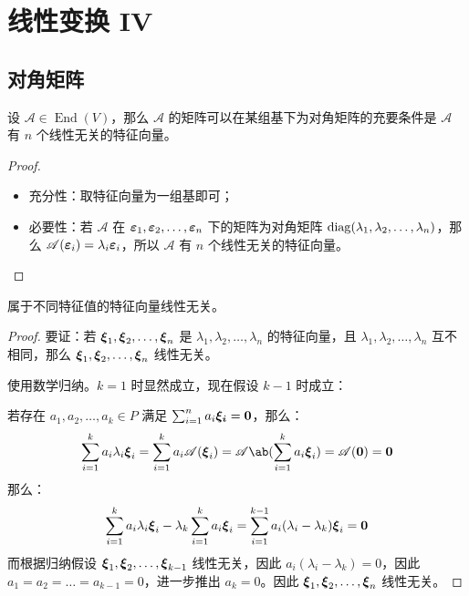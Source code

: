 \section{线性变换 IV}

\subsection{对角矩阵}

\begin{theorem}
	设 $\mathscr{A} \in \operatorname{End}(V)$，那么 $\mathscr{A}$ 的矩阵可以在某组基下为对角矩阵的充要条件是 $\mathscr{A}$ 有 $n$ 个线性无关的特征向量。

	\begin{proof}
		\begin{itemize}
			\item 充分性：取特征向量为一组基即可；
			\item 必要性：若 $\mathscr{A}$ 在 $\boldsymbol{\varepsilon}_1, \boldsymbol{\varepsilon}_2, \dots, \boldsymbol{\varepsilon}_n$ 下的矩阵为对角矩阵 $\operatorname{diag}(\lambda_1, \lambda_2, \dots, \lambda_n)$，那么 $\mathscr{A}(\boldsymbol{\varepsilon}_i) = \lambda_i \boldsymbol{\varepsilon}_i$，所以 $\mathscr{A}$ 有 $n$ 个线性无关的特征向量。
		\end{itemize}
	\end{proof}
\end{theorem}

\begin{theorem}
	属于不同特征值的特征向量线性无关。

	\begin{proof}
		要证：若 $\boldsymbol{\xi}_1, \boldsymbol{\xi}_2, \dots, \boldsymbol{\xi}_n$ 是 $\lambda_1, \lambda_2, \dots, \lambda_n$ 的特征向量，且 $\lambda_1, \lambda_2, \dots, \lambda_n$ 互不相同，那么 $\boldsymbol{\xi}_1, \boldsymbol{\xi}_2, \dots, \boldsymbol{\xi}_n$ 线性无关。

		使用数学归纳。$k=1$ 时显然成立，现在假设 $k - 1$ 时成立：

		若存在 $a_1, a_2, \dots, a_k \in P$ 满足 $\sum_{i=1}^n a_i \boldsymbol{\xi_i} = \boldsymbol{0}$，那么：
		$$
		\sum_{i=1}^k a_i \lambda_i \vect{\xi}_i = \sum_{i=1}^k a_i \mathscr{A}(\vect{\xi}_i) = \mathscr{A}\ab(\sum_{i=1}^k a_i \vect{\xi}_i) = \mathscr{A}(\vect{0}) = \vect{0}
		$$
		那么：
		$$
		\sum_{i=1}^k a_i \lambda_i \boldsymbol{\xi}_i - \lambda_k \sum_{i=1}^k a_i \boldsymbol{\xi}_i = \sum_{i=1}^{k-1} a_i (\lambda_i - \lambda_k) \boldsymbol{\xi}_i = \boldsymbol{0}
		$$
		而根据归纳假设 $\boldsymbol{\xi}_1, \boldsymbol{\xi}_2, \dots, \boldsymbol{\xi}_{k-1}$ 线性无关，因此 $a_i (\lambda_i - \lambda_k) = 0$，因此 $a_1 = a_2 = \dots = a_{k-1} = 0$，进一步推出 $a_k = 0$。因此 $\boldsymbol{\xi}_1, \boldsymbol{\xi}_2, \dots, \boldsymbol{\xi}_n$ 线性无关。
	\end{proof}
\end{theorem}

